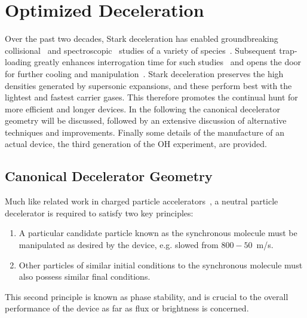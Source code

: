 %
%


\chapter{Optimized Deceleration}

Over the past two decades, Stark deceleration has enabled groundbreaking collisional~\cite{Sawyer2011,Kirste2012,Gao2018} and spectroscopic~\cite{Veldhoven2004,Hudson2006,Lev2006,Fast2018} studies of a variety of species~\cite{VanDeMeerakker2012}. 
Subsequent trap-loading greatly enhances interrogation time for such studies~\cite{Sawyer2008} and opens the door for further cooling and manipulation~\cite{Stuhl2012evap, Reens2017}. 
Stark deceleration preserves the high densities generated by supersonic expansions, and these perform best with the lightest and fastest carrier gases.
This therefore promotes the continual hunt for more efficient and longer devices.
In the following the canonical decelerator geometry will be discussed, followed by an extensive discussion of alternative techniques and improvements.
Finally some details of the manufacture of an actual device, the third generation of the OH experiment, are provided.


\section{Canonical Decelerator Geometry}

Much like related work in charged particle accelerators~\cite{McMillan1945}, a neutral particle decelerator is required to satisfy two key principles:
\begin{enumerate}
\item A particular candidate particle known as the synchronous molecule must be manipulated as desired by the device, e.g. slowed from $800-50$~m/s.
\item Other particles of similar initial conditions to the synchronous molecule must also possess similar final conditions.
\end{enumerate}
This second principle is known as phase stability, and is crucial to the overall performance of the device as far as flux or brightness is concerned.


